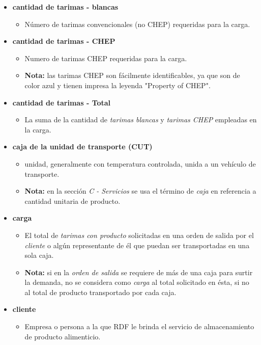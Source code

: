 \begin{itemize}
	\item \textbf{cantidad de tarimas - blancas}
	\begin{itemize}
		\item Número de tarimas convencionales (no CHEP) requeridas para la carga.
	\end{itemize}
	\item \textbf{cantidad de tarimas - CHEP}
	\begin{itemize}
		\item Numero de tarimas CHEP requeridas para la carga.
		\item \textbf{Nota:} las tarimas CHEP son fácilmente identificables, ya que son de color azul y tienen impresa la leyenda "Property of CHEP".
	\end{itemize}
	\item \textbf{cantidad de tarimas - Total}
	\begin{itemize}
		\item La suma de la cantidad de \emph{tarimas blancas} y \emph{tarimas CHEP} empleadas en la carga.
	\end{itemize}
	\item \textbf{caja de la unidad de transporte (CUT)}
	\begin{itemize}
		\item unidad, generalmente con temperatura controlada, unida a un vehículo de transporte.
		\item \textbf{Nota:} en la sección \emph{C - Servicios} se usa el término de \emph{caja} en referencia a cantidad unitaria de producto.
	\end{itemize}
	\item \textbf{carga}
	\begin{itemize}
		\item El total de \emph{tarimas con producto} solicitadas en una orden de salida por el \emph{cliente} o algún representante de él que puedan ser transportadas en una sola caja.
		\item \textbf{Nota:} si en la \emph{orden de salida} se requiere de más de una caja para surtir la demanda, no se considera como \emph{carga} al total solicitado en ésta, si no al total de producto transportado por cada caja.
	\end{itemize}
	\item \textbf{cliente}
	\begin{itemize}
		\item Empresa o persona a la que RDF le brinda el servicio de almacenamiento de producto alimenticio.

\end{itemize}
\end{itemize}
